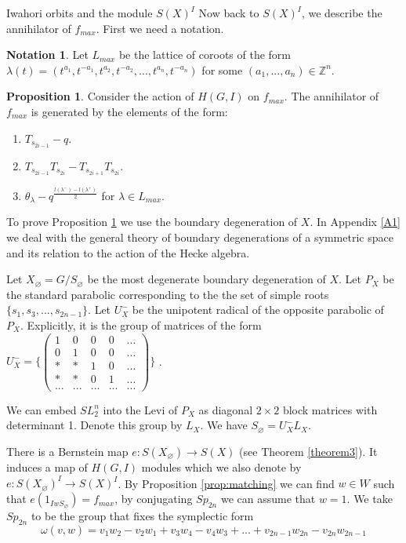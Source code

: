 \documentclass[12pt]{article}
\newcommand{\Z}{\mathbb{Z}}
\newcommand{\<}{\langle}
\renewcommand{\>}{\rangle}
\renewcommand{\emptyset}{\varnothing}
\theoremstyle{plain}
\theoremstyle{definition}
\newtheorem{prop}[theorem]{Proposition}
\newtheorem{Not}[theorem]{Notation}
\begin{document}
\begin{section}{Iwahori orbits and the module $S(X)^I$}
Now back to $S(X)^I$, we describe the annihilator of $f_{max}$. First we need a notation.
\begin{Not}
    Let $L_{max}$ be the lattice of coroots of the form $\lambda(t)=(t^{a_1},t^{-a_1},t^{a_2},t^{-a_2},...,t^{a_n},t^{-a_n})$ for some $(a_1,...,a_n)\in\Z^n$.
\end{Not}

\begin{prop}\label{ideal generaotrs}
    Consider the action of $H(G,I)$ on $f_{max}$. The annihilator of $f_{max}$ is generated by the elements of the form:
    \begin{enumerate}
        \item $T_{s_{2i-1}}-q$.
        \item $T_{s_{2i-1}}T_{s_{2i}}-T_{s_{2i+1}}T_{s_{2i}}$.
        \item $\theta_{\lambda}-q^\frac{l(\lambda^-)-l(\lambda^+)}{2}$ for $\lambda\in L_{max}$.
    \end{enumerate}
\end{prop}

    To prove Proposition \ref{ideal generaotrs} we use the boundary degeneration of $X$. In Appendix \ref{A1} we deal with the general theory of boundary degenerations of a symmetric space and its relation to the action of the Hecke algebra.
    
    Let $X_\emptyset=G/S_\emptyset$ be the most degenerate boundary degeneration of $X$. Let $P_X$ be the standard parabolic corresponding to the the set of simple roots $\{s_1,s_3,...,s_{2n-1}\}$. Let $U^-_X$ be the unipotent radical of the opposite parabolic of $P_X$.  Explicitly, it is the group of matrices of the form $U_X^-=\{\begin{pmatrix}
        1 & 0 & 0& 0&...\\
        0 & 1& 0 & 0&...\\
        * & * & 1& 0&...\\
        * & * & 0& 1&...\\
        ...& ...& ...& ...&...
    \end{pmatrix}\}$ .
    
    We can embed $SL_2^n$ into the Levi of $P_X$ as diagonal $2\times 2$ block matrices with determinant 1. Denote this group by $L_X$. We have $S_\emptyset=U^-_XL_X$. 
    
    There is a Bernstein map $e:S(X_\emptyset)\rightarrow S(X)$ (see Theorem \ref{theorem3}). It induces a map of $H(G,I)$ modules which we also denote by $e:S(X_\emptyset)^I\rightarrow S(X)^I$. By Proposition \ref{prop:matching} we can find $w\in W$ such that $e(1_{IwS_\emptyset})=f_{max}$, by conjugating $Sp_{2n}$ we can assume that $w=1$. We take $Sp_{2n}$ to be the group that fixes the symplectic form $$\omega(v,w)=v_1w_2-v_2w_1+v_3w_4-v_4w_3+...+v_{2n-1}w_{2n}-v_{2n}w_{2n-1}$$ 
    

\end{section}
\end{document}
